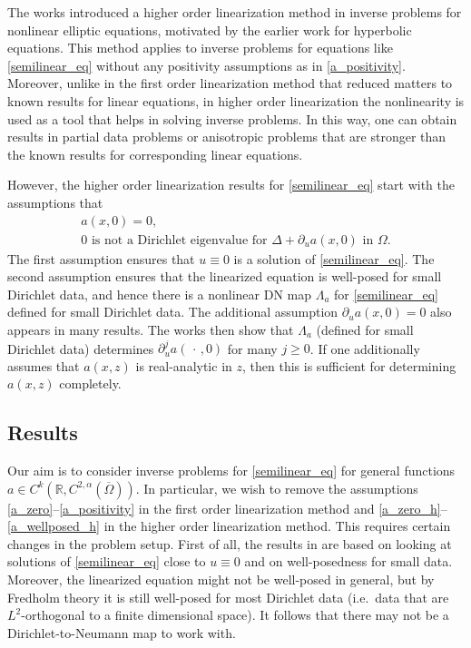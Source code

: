 \documentclass[11pt,a4paper]{amsart}
\theoremstyle{definition}
\numberwithin{equation}{section}
\newcommand{\mR}{\mathbb{R}}                    %
\newcommand{\ol}[1]{\overline{#1}}
\newcommand{\p}{\partial}
\begin{document}
The works \cites{FO, LLLS} introduced a higher order linearization method in inverse problems for nonlinear elliptic equations, motivated by the earlier work \cite{KLU} for hyperbolic equations. This method applies to inverse problems for equations like \eqref{semilinear_eq} without any positivity assumptions as in \eqref{a_positivity}. Moreover, unlike in the first order linearization method that reduced matters to known results for linear equations, in higher order linearization the nonlinearity is used as a tool that helps in solving inverse problems. In this way, one can obtain results in partial data problems \cites{LLLS2, KU, ST} or anisotropic problems \cites{FO, LLLS, CFO23, FKO23} that are stronger than the known results for corresponding linear equations.

However, the higher order linearization results for \eqref{semilinear_eq} start with the assumptions that  
\begin{gather}
a(x,0) = 0, \label{a_zero_h} \\
\text{$0$ is not a Dirichlet eigenvalue for $\Delta + \p_u a(x,0)$ in $\Omega$.} \label{a_wellposed_h}
\end{gather}
The first assumption ensures that $u \equiv 0$ is a solution of \eqref{semilinear_eq}. The second assumption ensures that the linearized equation is well-posed for small Dirichlet data, and hence there is a nonlinear DN map $\Lambda_a$ for \eqref{semilinear_eq} defined for small Dirichlet data. The additional assumption $\p_u a(x,0) = 0$ also appears in many results. The works \cites{FO, LLLS} then show that $\Lambda_a$ (defined for small Dirichlet data) determines $\p_u^j a(\,\cdot\,,0)$ for many $j \geq 0$. If one additionally assumes that $a(x,z)$ is real-analytic in $z$, then this is sufficient for determining $a(x,z)$ completely.

\subsection*{Results}

Our aim is to consider inverse problems for \eqref{semilinear_eq} for general functions $a \in C^{k}(\mR, C^{2,\alpha}(\ol{\Omega}))$. In particular, we wish to remove the assumptions \eqref{a_zero}--\eqref{a_positivity} in the first order linearization method and \eqref{a_zero_h}--\eqref{a_wellposed_h} in the higher order linearization method. This requires certain changes in the problem setup. First of all, the results in \cites{FO, LLLS} are based on looking at solutions of \eqref{semilinear_eq} close to $u \equiv 0$ and on well-posedness for small data. Moreover, the linearized equation might not be well-posed in general, but by Fredholm theory it is still well-posed for most Dirichlet data (i.e.\ data that are $L^2$-orthogonal to a finite dimensional space). It follows that there may not be a Dirichlet-to-Neumann map to work with.
\end{document}
